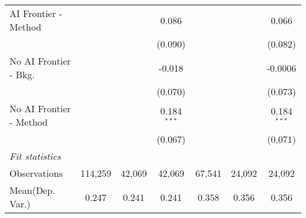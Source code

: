 \begin{tabular}{lcccccc}
   AI Frontier - Method    &               &               & 0.086         &               &               & 0.066\\   
                           &               &               & (0.090)       &               &               & (0.082)\\   
   No AI Frontier - Bkg.   &               &               & -0.018        &               &               & -0.0006\\   
                           &               &               & (0.070)       &               &               & (0.073)\\   
   No AI Frontier - Method &               &               & 0.184$^{***}$ &               &               & 0.184$^{***}$\\   
                           &               &               & (0.067)       &               &               & (0.071)\\   
   \midrule
   \emph{Fit statistics}\\
   Observations            & 114,259       & 42,069        & 42,069        & 67,541        & 24,092        & 24,092\\  
Mean(Dep. Var.) & 0.247 & 0.241 & 0.241 & 0.358 & 0.356 & 0.356 \\
   

\end{tabular}
